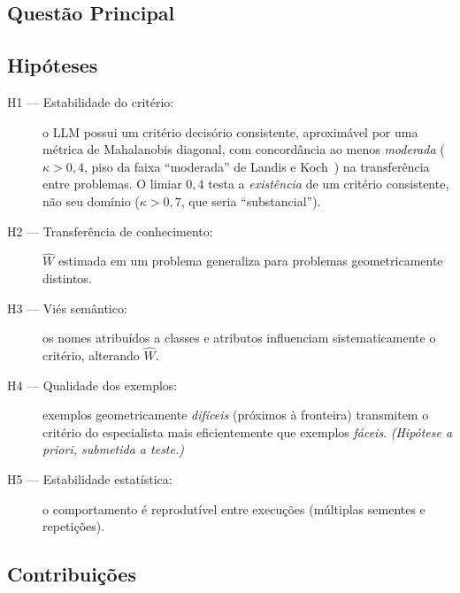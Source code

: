 \documentclass[12pt,a4paper]{article}
\newcommand{\West}{\ensuremath{\hat{W}}}   %
\begin{document}
\subsection*{Questão Principal}

\begin{center}
\end{center}

\subsection*{Hipóteses}

\begin{description}
  \item[H1 — Estabilidade do critério:] o LLM possui um critério decisório consistente,
    aproximável por uma métrica de Mahalanobis diagonal, com concordância ao menos
    \emph{moderada} ($\kappa > 0{,}4$, piso da faixa ``moderada'' de Landis e
    Koch~\cite{landisKoch1977}) na transferência entre problemas. O limiar $0{,}4$ testa a
    \emph{existência} de um critério consistente, não seu domínio ($\kappa > 0{,}7$, que
    seria ``substancial'').
  \item[H2 — Transferência de conhecimento:] \West{} estimada em um problema generaliza
    para problemas geometricamente distintos.
  \item[H3 — Viés semântico:] os nomes atribuídos a classes e atributos influenciam
    sistematicamente o critério, alterando \West{}.
  \item[H4 — Qualidade dos exemplos:] exemplos geometricamente \emph{difíceis} (próximos
    à fronteira) transmitem o critério do especialista mais eficientemente que exemplos
    \emph{fáceis}. \emph{(Hipótese a priori, submetida a teste.)}
  \item[H5 — Estabilidade estatística:] o comportamento é reprodutível entre execuções
    (múltiplas sementes e repetições).
\end{description}

\subsection*{Contribuições}
\end{document}
